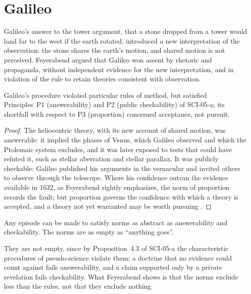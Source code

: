 \documentclass{situationist-preprint}
\begin{document}
\section{Galileo}\label{s:galileo}

Galileo's answer to the tower argument, that a stone dropped from a tower would land far to the west if the earth rotated, introduced a new interpretation of the observation: the stone shares the earth's motion, and shared motion is not perceived. Feyerabend argued that Galileo won assent by rhetoric and propaganda, without independent evidence for the new interpretation, and in violation of the rule to retain theories consistent with observation.

\begin{proposition}\label{p:galileo}
Galileo's procedure violated particular rules of method, but satisfied Principles~P1 (answerability) and P2 (public checkability) of SCI-05-a; its shortfall with respect to P3 (proportion) concerned acceptance, not pursuit.
\end{proposition}

\begin{proof}
The heliocentric theory, with its new account of shared motion, was answerable: it implied the phases of Venus, which Galileo observed and which the Ptolemaic system excludes, and it was later exposed to tests that could have refuted it, such as stellar aberration and stellar parallax. It was publicly checkable: Galileo published his arguments in the vernacular and invited others to observe through the telescope. Where his confidence outran the evidence available in 1632, as Feyerabend rightly emphasizes, the norm of proportion records the fault; but proportion governs the confidence with which a theory is accepted, and a theory not yet warranted may be worth pursuing \citep{Laudan1977}.
\end{proof}

\begin{objection}[Redescription]
Any episode can be made to satisfy norms as abstract as answerability and checkability. The norms are as empty as \enquote{anything goes}.
\end{objection}

\begin{reply}
They are not empty, since by Proposition~4.3 of SCI-05-a the characteristic procedures of pseudo-science violate them: a doctrine that no evidence could count against fails answerability, and a claim supported only by a private revelation fails checkability. What Feyerabend shows is that the norms exclude less than the rules, not that they exclude nothing.
\end{reply}
\end{document}
